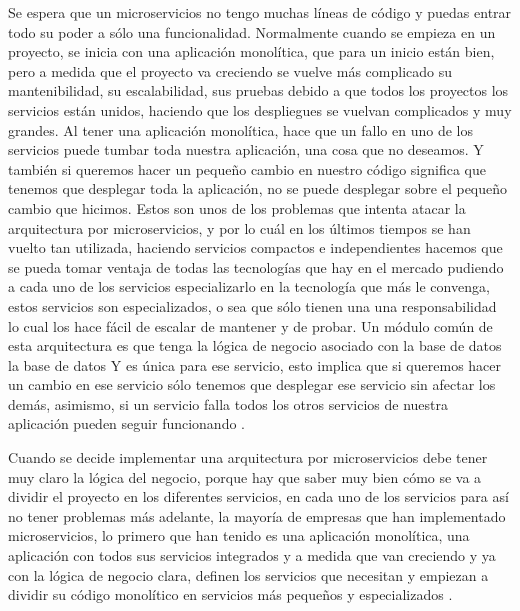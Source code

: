 
Se espera que un microservicios no tengo muchas líneas de código y puedas entrar todo su poder a sólo una funcionalidad. Normalmente cuando se empieza en un proyecto, se inicia con una aplicación monolítica, que para un inicio están bien, pero a medida que el proyecto va creciendo se vuelve más complicado su mantenibilidad, su escalabilidad, sus pruebas debido a que todos los proyectos los servicios están unidos, haciendo que los despliegues se vuelvan complicados y muy grandes. Al tener una aplicación monolítica, hace que un fallo en uno de los servicios puede tumbar toda nuestra aplicación, una cosa que no deseamos. Y también si queremos hacer un pequeño cambio en nuestro código significa que tenemos que desplegar toda la aplicación, no se puede desplegar sobre el pequeño cambio que hicimos. Estos son unos de los problemas que intenta atacar la arquitectura por microservicios, y por lo cuál en los últimos tiempos se han vuelto tan utilizada, haciendo servicios compactos e independientes hacemos que se pueda tomar ventaja de todas las tecnologías que hay en el mercado pudiendo a cada uno de los servicios especializarlo en la tecnología que más le convenga, estos servicios son especializados, o sea que sólo tienen una una responsabilidad lo cual los hace fácil de escalar de mantener y de probar. Un módulo común de esta arquitectura es que tenga la lógica de negocio asociado con la base de datos la base de datos Y es única para ese servicio, esto implica que si queremos hacer un cambio en ese servicio sólo tenemos que desplegar ese servicio sin afectar los demás, asimismo, si un servicio falla todos los otros servicios de nuestra aplicación pueden seguir funcionando .


Cuando se decide implementar una arquitectura por microservicios debe tener muy claro la lógica del negocio, porque hay que saber muy bien cómo se va a dividir el proyecto en los diferentes servicios, en cada uno de los servicios para así no tener problemas más adelante, la mayoría de empresas que han implementado microservicios, lo primero que han tenido es una aplicación monolítica, una aplicación con todos sus servicios integrados y a medida que van creciendo y ya con la lógica de negocio clara, definen los servicios que necesitan y empiezan a dividir su código monolítico en servicios más pequeños y especializados \cite{Dragoni2017}. 

